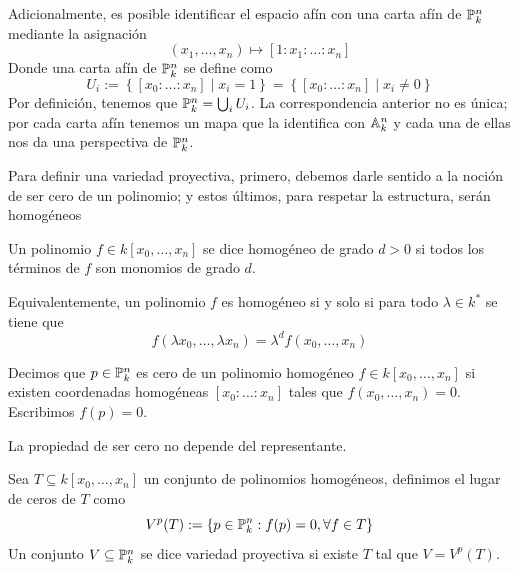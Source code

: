 \documentclass[11pt]{article}
\begin{document}
\vspace{1mm}
\noindent Adicionalmente, es posible identificar el espacio afín con una carta afín de 
$\P_{k}^{n}$ mediante la asignación
\begin{equation*}
    (x_{1},\dots,x_{n})\mapsto[1:x_{1}:\dots:x_{n}]
\end{equation*}
Donde una carta afín de $\P_{k}^{n}$ se define como
\begin{equation*}
    U_{i}:=\left\{[x_{0}:\dots:x_{n}]\mid x_{i}=1\right\}
    =\left\{[x_{0}:\dots:x_{n}]\mid x_{i}\neq0\right\}
\end{equation*}
Por definición, tenemos que $\P_{k}^{n}=\bigcup_{i} U_{i}$. La correspondencia anterior no es 
única; por cada carta afín tenemos un mapa que la identifica con $\A_{k}^{n}$ y cada una de ellas
nos da una perspectiva de $\P_{k}^{n}$.

\vspace{1mm}
\noindent Para definir una variedad proyectiva, primero, debemos darle sentido a la noción de ser 
cero de un polinomio; y estos últimos, para respetar la estructura, serán homogéneos

\begin{dfn}
    Un polinomio $f\in k[x_{0},\dots,x_{n}]$ se dice homogéneo de grado $d>0$ si todos los 
    términos de $f$ son monomios de grado $d$.
\end{dfn}

\noindent Equivalentemente, un polinomio $f$ es homogéneo si y solo si para todo 
$\lambda\in k^{*}$ se tiene que
\begin{equation*}
    f(\lambda x_{0},\dots,\lambda x_{n})=\lambda^{d}f(x_{0},\dots,x_{n})
\end{equation*}

\begin{dfn}
    Decimos que $p\in\P_{k}^{n}$ es cero de un polinomio homogéneo $f\in k[x_{0},\dots,x_{n}]$ si
    existen coordenadas homogéneas $[x_{0}:\dots:x_{n}]$ tales que $f(x_{0},\dots,x_{n})=0$. 
    Escribimos $f(p)=0$.
\end{dfn}

\obs La propiedad de ser cero no depende del representante.

\begin{dfn}
    Sea $T\subseteq k[x_{0},\dots,x_{n}]$ un conjunto de polinomios homogéneos, definimos el 
    lugar de ceros de $T$ como
    \begin{equation*}
        V^{p}(T):=\{p\in\P_{k}^{n}:f(p)=0, \forall f\in T\}
    \end{equation*}
    Un conjunto $V\subseteq\P_{k}^{n}$ se dice variedad proyectiva si existe $T$ tal que 
    $V=V^{p}(T)$.
\end{dfn}
\end{document}
